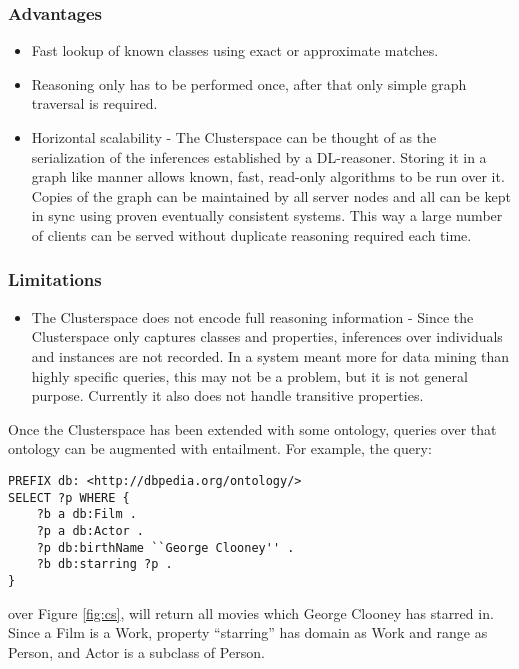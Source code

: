 \documentclass[journal]{IEEEtran}
\begin{document}
\subsubsection*{Advantages}
\begin{itemize}
    \item Fast lookup of known classes using exact or approximate matches.
    \item Reasoning only has to be performed once, after that only simple graph
        traversal is required.
    \item Horizontal scalability - The Clusterspace can be thought of as the
        serialization of the inferences established by a DL-reasoner. Storing
        it in a graph like manner allows known, fast, read-only algorithms to
        be run over it. Copies of the graph can be maintained by all server
        nodes and all can be kept in sync using proven eventually consistent
        systems. This way a large number of clients can be served without
        duplicate reasoning required each time.
\end{itemize}

\subsubsection*{Limitations}
\begin{itemize}
    \item The Clusterspace does not encode full reasoning information - Since
        the Clusterspace only captures classes and properties, inferences over
        individuals and instances are not recorded. In a system meant more for
        data mining than highly specific queries, this may not be a problem,
        but it is not general purpose. Currently it also does not handle
        transitive properties.
\end{itemize}

Once the Clusterspace has been extended with some ontology, queries over that
ontology can be augmented with entailment. For example, the query:

\begin{verbatim}
PREFIX db: <http://dbpedia.org/ontology/>
SELECT ?p WHERE {
    ?b a db:Film .
    ?p a db:Actor .
    ?p db:birthName ``George Clooney'' .
    ?b db:starring ?p .
}
\end{verbatim}

over Figure \ref{fig:cs}, will return all movies which George Clooney has starred in.
Since a Film is a Work, property ``starring'' has domain as Work
and range as Person, and Actor is a subclass of Person.
\end{document}
